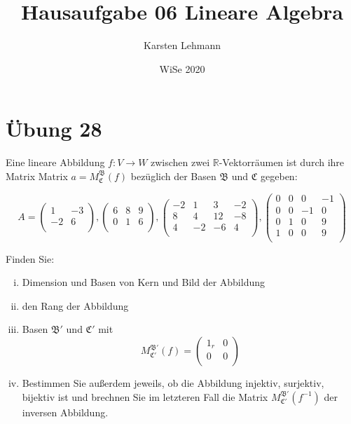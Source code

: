 \documentclass{article}
\author{Karsten Lehmann}
\date{WiSe 2020}
\title{Hausaufgabe 06 Lineare Algebra}
\begin{document}
\section*{Übung 28}

Eine lineare Abbildung $f \colon V \to W$ zwischen zwei $\mathbb{R}$-Vektorräumen ist durch ihre Matrix
Matrix $a = M^{\mathfrak{B}}_{\mathfrak{C}}(f)$ bezüglich der Basen $\mathfrak{B}$ und $\mathfrak{C}$
gegeben:

\[
  A = \begin{pmatrix}
    1  & -3 \\
    -2 & 6  \\
  \end{pmatrix},
  \begin{pmatrix}
    6 & 8 & 9 \\
    0 & 1 & 6 \\ 
  \end{pmatrix},
  \begin{pmatrix}
    -2 & 1  &  3 & -2 \\
     8 & 4  & 12 & -8 \\
     4 & -2 & -6 &  4 \\
  \end{pmatrix},
  \begin{pmatrix}
    0 & 0 &  0 & -1 \\
    0 & 0 & -1 &  0 \\
    0 & 1 &  0 &  9 \\
    1 & 0 &  0 &  9 \\
  \end{pmatrix}
\]

Finden Sie:

\begin{enumerate}[(i)]
\item Dimension und Basen von Kern und Bild der Abbildung
\item den Rang der Abbildung
\item Basen $\mathfrak{B}'$ und $\mathfrak{C}'$ mit
  \[
    M^{\mathfrak{B}'}_{\mathfrak{C}'}(f) = \begin{pmatrix}
      1_r & 0 \\
      0   & 0 \\
    \end{pmatrix}
  \]
\item Bestimmen Sie außerdem jeweils, ob die Abbildung injektiv, surjektiv, bijektiv ist und
  brechnen Sie im letzteren Fall die Matrix $M^{\mathfrak{B}'}_{\mathfrak{C}'}(f^{-1})$ der inversen Abbildung.
\end{enumerate}
\end{document}
